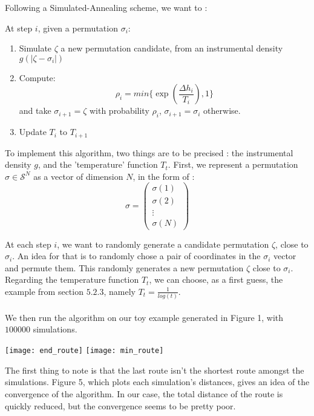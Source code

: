 \documentclass{article}
\begin{document}
Following a Simulated-Annealing scheme, we want to :

At step $i$, given a permutation $\sigma_i$:
\begin{enumerate}
    \item  Simulate $\zeta$ a new permutation candidate, from an 
    instrumental density $g(|\zeta-\sigma_i|)$
    \item Compute: $$ \rho_i = min\{\exp (\frac{\Delta h_i}{T_i}) , 1\}$$ 
    and take $\sigma_{i+1} = \zeta$ with probability $\rho_i$, $\sigma_{i+1} = \sigma_{i}$ otherwise. 
    \item Update $T_i$ to $T_{i+1}$
\end{enumerate}


To implement this algorithm, two things are to be precised :
 the instrumental density $g$, and the 'temperature' function $T_t$.
 First, we represent a permutation $\sigma \in \mathcal{S}^N$ as a
 vector of dimension $N$, in the form of : 
$$\sigma = \left ( \begin{array}{c} \sigma(1) \\ \sigma(2) \\ \vdots \\ \sigma(N) \end{array} \right )$$ 

At each step $i$, we want to randomly generate a candidate
permutation $\zeta$, close to $\sigma_i$.
An idea for that is to randomly chose a pair of coordinates 
in the $\sigma_i$ vector and permute them. This randomly
generates a new permutation $\zeta$ close to $\sigma_i$.
Regarding the temperature function $T_t$, we can choose, as a first guess, 
the example from section $5.2.3$, namely $T_t = \frac{1}{log(t)}$. \\ \\
We then run the algorithm on our toy example generated in Figure 1, with $100000$ simulations.
\begin{center}   
    \begin{multicols}{2}
        \texttt{[image: end\_route]} \vspace{0.5cm}
        \texttt{[image: min\_route]}
    \end{multicols}
\end{center}
The first thing to note is that the last route isn't the shortest route amongst
the simulations. Figure 5, which plots each simulation's distances, gives an 
idea of the convergence of the algorithm. In our case, the total distance
of the route is quickly reduced, but the convergence seems to be pretty poor. 
\end{document}
